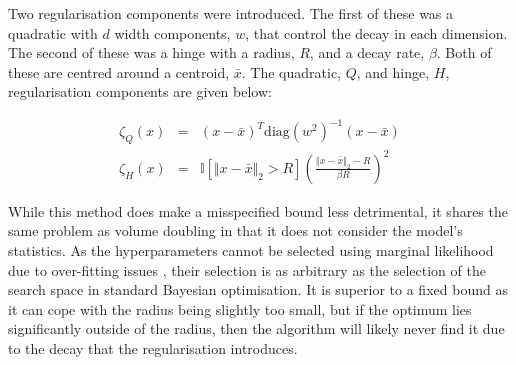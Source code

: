 \documentclass[preprint]{elsarticle}
\begin{document}
Two regularisation components were introduced. The first of these was a quadratic with $d$ width components, $w$, that control the decay in each dimension. The second of these was a hinge with a radius, $R$, and a decay rate, $\beta$. Both of these are centred around a centroid, $\bar{x}$. The quadratic, $Q$, and hinge, $H$, regularisation components are given below:
\begin{linenomath*}
\begin{eqnarray}
\zeta_Q(x)&=&(x-\bar{x})^T\mathrm{diag}(w^2)^{-1}(x-\bar{x})\\\nonumber
\zeta_H(x)&=&\mathbb{I}\left[\Vert x-\bar{x}\Vert_2>R\right]\left(\frac{\Vert x-\bar{x}\Vert_2-R}{\beta R}\right)^2
\end{eqnarray} 
\end{linenomath*}
%

While this method does make a misspecified bound less detrimental, it shares the same problem as volume doubling in that it does not consider the model's statistics. As the hyperparameters cannot be selected using marginal likelihood due to over-fitting issues \citep{shahriari2016unbounded}, their selection is as arbitrary as the selection of the search space in standard Bayesian optimisation. It is superior to a fixed bound as it can cope with the radius being slightly too small, but if the optimum lies significantly outside of the radius, then the algorithm will likely never find it due to the decay that the regularisation introduces. 

\end{document}
